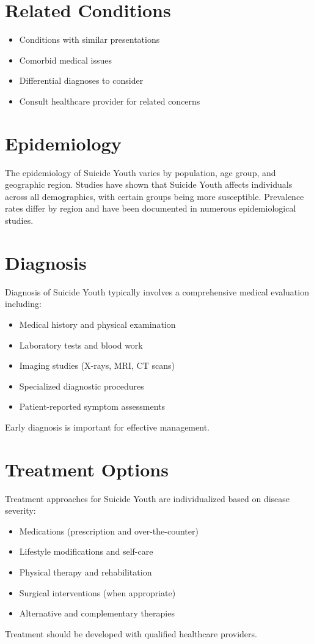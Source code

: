 \section*{Related Conditions}
\begin{itemize}
  \item Conditions with similar presentations
  \item Comorbid medical issues
  \item Differential diagnoses to consider
  \item Consult healthcare provider for related concerns
\end{itemize}

\section*{Epidemiology}
The epidemiology of Suicide Youth varies by population, age group, and geographic region. Studies have shown that Suicide Youth affects individuals across all demographics, with certain groups being more susceptible. Prevalence rates differ by region and have been documented in numerous epidemiological studies.

\section*{Diagnosis}
Diagnosis of Suicide Youth typically involves a comprehensive medical evaluation including:
\begin{itemize}
  \item Medical history and physical examination
  \item Laboratory tests and blood work
  \item Imaging studies (X-rays, MRI, CT scans)
  \item Specialized diagnostic procedures
  \item Patient-reported symptom assessments
\end{itemize}
Early diagnosis is important for effective management.

\section*{Treatment Options}
Treatment approaches for Suicide Youth are individualized based on disease severity:
\begin{itemize}
  \item Medications (prescription and over-the-counter)
  \item Lifestyle modifications and self-care
  \item Physical therapy and rehabilitation
  \item Surgical interventions (when appropriate)
  \item Alternative and complementary therapies
\end{itemize}
Treatment should be developed with qualified healthcare providers.

